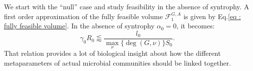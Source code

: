 \documentclass[12pt, titlepage]{report}
\begin{document}
We start with the ``null'' case and study feasibility in the absence of syntrophy. A first order approximation of the fully feasible volume $\mathcal{F}^{G,A}_1$ is given by Eq.\eqref{eq : fully feasible volume}.
In the absence of syntrophy $\alpha_0=0$, it becomes:
\begin{equation}
\gamma_0 R_0 \lessapprox \frac{l_0}{\max_\nu\{\deg(G,\nu)\}S_0}. \label{eq: fully feasible volume no syntrophy}
\end{equation}
That relation provides a lot of biological insight about how the different metaparameters of actual microbial communities should be linked together. %
\end{document}
